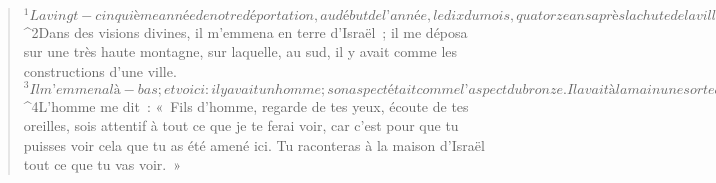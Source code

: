   
  
      
         
      \bchapter{}
      \begin{verse}
${}^{1}La vingt-cinquième année de notre déportation, au début de l’année, le dix du mois, quatorze ans après la chute de la ville, en ce jour même, la main du Seigneur se posa sur moi. Il m’emmena là-bas. 
${}^{2}Dans des visions divines, il m’emmena en terre d’Israël ; il me déposa sur une très haute montagne, sur laquelle, au sud, il y avait comme les constructions d’une ville. 
${}^{3}Il m’emmena là-bas ; et voici : il y avait un homme ; son aspect était comme l’aspect du bronze. Il avait à la main une sorte de cordon de lin ainsi qu’une canne à mesurer. Il se tenait à la porte. 
${}^{4}L’homme me dit : « Fils d’homme, regarde de tes yeux, écoute de tes oreilles, sois attentif à tout ce que je te ferai voir, car c’est pour que tu puisses voir cela que tu as été amené ici. Tu raconteras à la maison d’Israël tout ce que tu vas voir. »
      

\end{verse}
